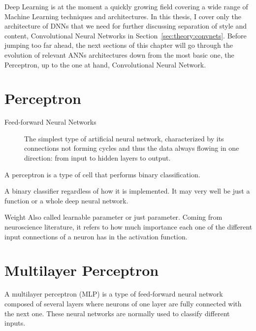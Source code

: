 Deep Learning is at the moment a quickly growing field covering a wide range of Machine Learning techniques and architectures.
In this thesis, I cover only the architecture of DNNs that we need for further discussing separation of style and content, Convolutional Neural Networks in Section~\ref{sec:theory:convnets}.
Before jumping too far ahead, the next sections of this chapter will go through the evolution of relevant ANNs architectures down from the most basic one, the Perceptron, up to the one at hand, Convolutional Neural Network.



\section{Perceptron}
\label{sec:Perceptron}

\begin{description}
  \item[Feed-forward Neural Networks]
  The simplest type of artificial neural network, characterized by its connections not forming cycles and thus the data always flowing in one direction: from input to hidden layers to output.
\end{description}
A perceptron is a type of cell that performs binary classification.

A binary classifier regardless of how it is implemented. It may very well be just a function or a whole deep neural network.

Weight
Also called learnable parameter or just parameter.
Coming from neuroscience literature, it refers to how much importance each one of the different input connections of a neuron has in the activation function.
\todo[inline]



\section{Multilayer Perceptron}
\label{sec:theory:mlp}
A multilayer perceptron (MLP) is a type of feed-forward neural network composed of several layers where neurons of one layer are fully connected with the next one.
These neural networks are normally used to classify different inputs.

